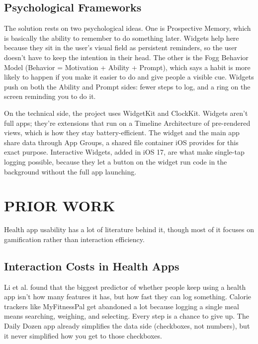 \documentclass[10pt,twocolumn]{article}
\begin{document}
\subsection{Psychological Frameworks}

The solution rests on two psychological ideas. One is Prospective Memory, which is basically the ability to remember to do something later.\cite{PielotNotifications} Widgets help here because they sit in the user's visual field as persistent reminders, so the user doesn't have to keep the intention in their head. The other is the Fogg Behavior Model (Behavior = Motivation + Ability + Prompt),\cite{BROADStudy} which says a habit is more likely to happen if you make it easier to do and give people a visible cue. Widgets push on both the Ability and Prompt sides: fewer steps to log, and a ring on the screen reminding you to do it.

On the technical side, the project uses WidgetKit and ClockKit. Widgets aren't full apps; they're extensions that run on a Timeline Architecture of pre-rendered views, which is how they stay battery-efficient.\cite{AppleHIGWidgets} The widget and the main app share data through App Groups, a shared file container iOS provides for this exact purpose. Interactive Widgets, added in iOS 17, are what make single-tap logging possible, because they let a button on the widget run code in the background without the full app launching.\cite{AppleHIGWidgets}

\section{PRIOR WORK}

Health app usability has a lot of literature behind it, though most of it focuses on gamification rather than interaction efficiency.

\subsection{Interaction Costs in Health Apps}

Li et al. found that the biggest predictor of whether people keep using a health app isn't how many features it has, but how fast they can log something.\cite{McDanielProspectiveMemory} Calorie trackers like MyFitnessPal get abandoned a lot because logging a single meal means searching, weighing, and selecting. Every step is a chance to give up. The Daily Dozen app already simplifies the data side (checkboxes, not numbers), but it never simplified how you get to those checkboxes.
\end{document}

